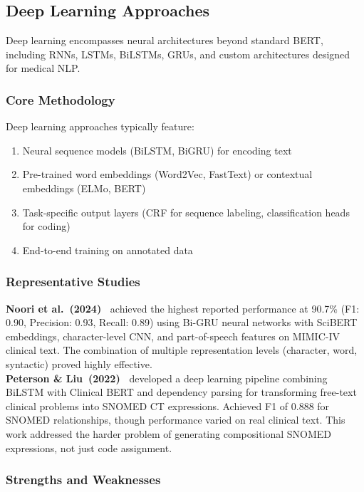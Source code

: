 \subsection{Deep Learning Approaches}

Deep learning encompasses neural architectures beyond standard BERT, including RNNs, LSTMs, BiLSTMs, GRUs, and custom architectures designed for medical NLP.

\subsubsection{Core Methodology}

Deep learning approaches typically feature:
\begin{enumerate}
    \item Neural sequence models (BiLSTM, BiGRU) for encoding text
    \item Pre-trained word embeddings (Word2Vec, FastText) or contextual embeddings (ELMo, BERT)
    \item Task-specific output layers (CRF for sequence labeling, classification heads for coding)
    \item End-to-end training on annotated data
\end{enumerate}

\subsubsection{Representative Studies}

\textbf{Noori et al.~(2024)~\cite{Noori:2024}} achieved the highest reported performance at 90.7\% (F1: 0.90, Precision: 0.93, Recall: 0.89) using Bi-GRU neural networks with SciBERT embeddings, character-level CNN, and part-of-speech features on MIMIC-IV clinical text. The combination of multiple representation levels (character, word, syntactic) proved highly effective.\\

\textbf{Peterson \& Liu~(2022)~\cite{Peterson:2022}} developed a deep learning pipeline combining BiLSTM with Clinical BERT and dependency parsing for transforming free-text clinical problems into SNOMED CT expressions. Achieved F1 of 0.888 for SNOMED relationships, though performance varied on real clinical text. This work addressed the harder problem of generating compositional SNOMED expressions, not just code assignment.\\

\subsubsection{Strengths and Weaknesses}

